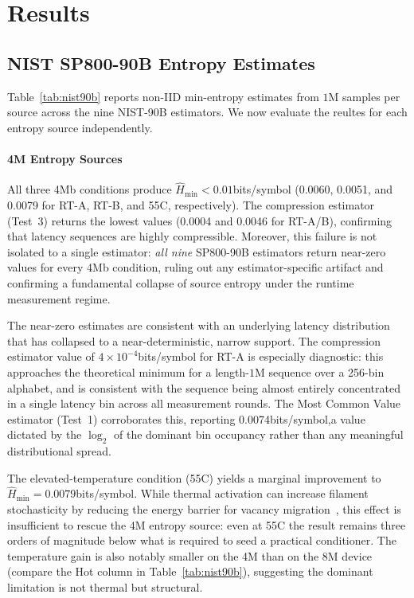 
\section{Results}
\subsection{NIST SP800-90B Entropy Estimates}
Table~\ref{tab:nist90b} reports non-IID min-entropy estimates from $1\mathrm{M}$ samples per source across the nine NIST-90B estimators. We now evaluate the reultes for each entropy source independently.

\paragraph{4M Entropy Sources}
All three 4Mb conditions produce $\hat{H}_{\min} < 0.01$bits/symbol (0.0060, 0.0051, and 0.0079 for RT-A, RT-B, and 55\textdegree{}C, respectively).  The compression estimator (Test~3) returns the lowest values (0.0004 and 0.0046 for RT-A/B), confirming that latency sequences are highly compressible.  Moreover, this failure is not isolated to a single estimator: \emph{all nine} SP800-90B estimators return near-zero values for every 4Mb condition, ruling out any estimator-specific artifact and confirming a fundamental collapse of source entropy under the runtime measurement regime.

The near-zero estimates are consistent with an underlying latency distribution that has collapsed to a near-deterministic, narrow support.  The compression estimator value of $4\times10^{-4}$bits/symbol for RT-A is especially diagnostic: this approaches the theoretical minimum for a length-$1\mathrm{M}$ sequence over a 256-bin alphabet, and is consistent with the sequence being almost entirely concentrated in a single latency bin across all measurement rounds.  The Most Common Value estimator (Test~1) corroborates this, reporting 0.0074bits/symbol,a value dictated by the $\log_2$ of the dominant bin occupancy rather than any meaningful distributional spread.

The elevated-temperature condition (55\textdegree{}C) yields a marginal improvement to $\hat{H}_{\min} = 0.0079$bits/symbol.  While thermal activation can increase filament stochasticity by reducing the energy barrier for vacancy migration~\cite{yu2012switching}, this effect is insufficient to rescue the 4M entropy source: even at 55\textdegree{}C the result remains three orders of magnitude below what is required to seed a practical conditioner. The temperature gain is also notably smaller on the 4M than on the 8M device (compare the Hot column in Table~\ref{tab:nist90b}), suggesting the dominant limitation is not thermal but structural.

